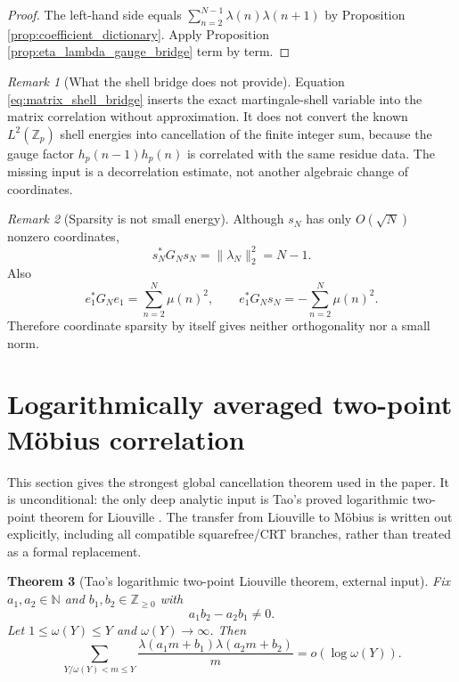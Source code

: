 \documentclass[11pt]{amsart}
\numberwithin{equation}{section}
\theoremstyle{plain}
\newtheorem{theorem}{Theorem}[section]
\theoremstyle{definition}
\theoremstyle{remark}
\newtheorem{remark}[theorem]{Remark}
\newcommand{\N}{\mathbb N}
\newcommand{\Z}{\mathbb Z}
\newcommand{\mob}{\mu}
\newcommand{\liou}{\lambda}
\begin{document}
\begin{proof}
The left-hand side equals $\sum_{n=2}^{N-1}\liou(n)\liou(n+1)$ by Proposition \ref{prop:coefficient_dictionary}.  Apply Proposition \ref{prop:eta_lambda_gauge_bridge} term by term.
\end{proof}

\begin{remark}[What the shell bridge does not provide]
\label{rem:matrix_shell_no_decorrelation}
Equation \eqref{eq:matrix_shell_bridge} inserts the exact martingale-shell variable into the matrix correlation without approximation.  It does not convert the known $L^2(\Z_p)$ shell energies into cancellation of the finite integer sum, because the gauge factor $h_p(n-1)h_p(n)$ is correlated with the same residue data.  The missing input is a decorrelation estimate, not another algebraic change of coordinates.
\end{remark}

\begin{remark}[Sparsity is not small energy]
\label{rem:sparsity_not_energy}
Although $s_N$ has only $O(\sqrt N)$ nonzero coordinates,
\begin{equation}
s_N^*G_Ns_N=\|\liou_N\|_2^2=N-1.
\label{eq:sN_energy}
\end{equation}
Also
\begin{equation}
e_1^*G_Ne_1=\sum_{n=2}^{N}\mob(n)^2,
\qquad
e_1^*G_Ns_N=-\sum_{n=2}^{N}\mob(n)^2.
\label{eq:mu_lambda_G_overlap}
\end{equation}
Therefore coordinate sparsity by itself gives neither orthogonality nor a small norm.
\end{remark}

\section{Logarithmically averaged two-point Möbius correlation}
\label{sec:log_mobius}

This section gives the strongest global cancellation theorem used in the paper.  It is unconditional: the only deep analytic input is Tao's proved logarithmic two-point theorem for Liouville \cite{Tao2016}.  The transfer from Liouville to Möbius is written out explicitly, including all compatible squarefree/CRT branches, rather than treated as a formal replacement.

\begin{theorem}[Tao's logarithmic two-point Liouville theorem, external input]
\label{thm:Tao_external}
Fix $a_1,a_2\in\N$ and $b_1,b_2\in\Z_{\ge0}$ with
\begin{equation}
a_1b_2-a_2b_1\ne0.
\label{eq:Tao_nondegeneracy}
\end{equation}
Let $1\le\omega(Y)\le Y$ and $\omega(Y)\to\infty$.  Then
\begin{equation}
\sum_{Y/\omega(Y)<m\le Y}
\frac{\liou(a_1m+b_1)\liou(a_2m+b_2)}{m}
=o(\log\omega(Y)).
\label{eq:Tao_liouville}
\end{equation}
\end{theorem}
\end{document}
